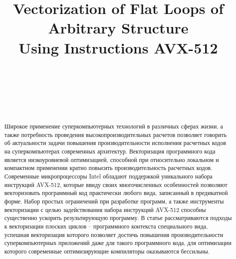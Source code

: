 \documentclass[
11pt,%
tightenlines,%
twoside,%
onecolumn,%
nofloats,%
nobibnotes,%
nofootinbib,%
superscriptaddress,%
noshowpacs,%
centertags]%
{revtex4}
\begin{document}

\title{Vectorization of Flat Loops of Arbitrary Structure\\Using Instructions AVX-512}

\author{~}

\author{~}

\author{~}



\begin{abstract}
Широкое применение суперкомпьютерных технологий в различных сферах жизни, а также потребность проведения высокопроизводительных расчетов позволяет говорить об актуальности задачи повышения производительности исполнения расчетных кодов на суперкомпьютерах современных архитектур.
Векторизация программного кода является низкоуровневой оптимизацией, способной при относительно локальном и компактном применении кратно повысить производительность расчетных кодов.
Современные микропроцессоры Intel обладают поддержкой уникального набора инструкций AVX-512, которые ввиду своих многочисленных особенностей позволяют векторизовать программный код практически любого вида, записанный в предикатной форме.
Набор простых ограничений при разработке программ, а также инструменты векторизации с целью задействования набора инструкций AVX-512 способны существенно ускорить результирующую программу.
В статье рассматриваются подходы к векторизации плоских циклов -- программного контекста специального вида, успешная векторизация которого позволяет достичь повышения производительности суперкомпьютерных приложений даже для такого программного кода, для оптимизации которого современные оптимизирующие компиляторы оказываются бессильны.
\end{abstract}
\end{document}
